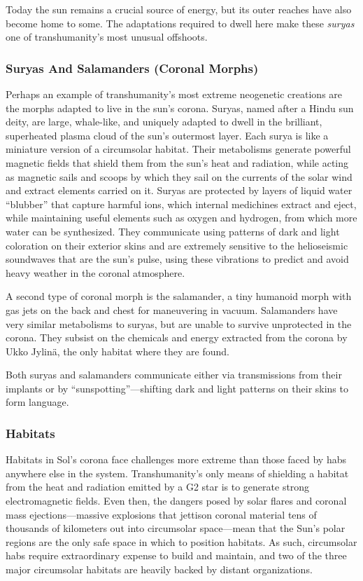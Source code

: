 Today the sun remains a crucial source of energy, 
but its outer reaches have also become home to some. 
The adaptations required to dwell here make these 
\textit{suryas} one of transhumanity's most unusual offshoots.

\subsubsection{Suryas And Salamanders (Coronal Morphs)}

Perhaps an example of transhumanity's most extreme 
neogenetic creations are the morphs adapted to live 
in the sun's corona. Suryas, named after a Hindu sun 
deity, are large, whale-like, and uniquely adapted to 
dwell in the brilliant, superheated plasma cloud of the 
sun's outermost layer. Each surya is like a miniature 
version of a circumsolar habitat. Their metabolisms 
generate powerful magnetic fields that shield them 
from the sun's heat and radiation, while acting as 
magnetic sails and scoops by which they sail on the 
currents of the solar wind and extract elements carried 
on it. Suryas are protected by layers of liquid water 
``blubber'' that capture harmful ions, which internal 
medichines extract and eject, while maintaining useful 
elements such as oxygen and hydrogen, from which 
more water can be synthesized. They communicate 
using patterns of dark and light coloration on their 
exterior skins and are extremely sensitive to the helioseismic soundwaves that are the sun's pulse, using 
these vibrations to predict and avoid heavy weather in 
the coronal atmosphere.

A second type of coronal morph is the salamander, 
a tiny humanoid morph with gas jets on the back and 
chest for maneuvering in vacuum. Salamanders have 
very similar metabolisms to suryas, but are unable to 
survive unprotected in the corona. They subsist on the 
chemicals and energy extracted from the corona by 
Ukko Jylinä, the only habitat where they are found.

Both suryas and salamanders communicate either 
via transmissions from their implants or by ``sunspotting''—shifting dark and light patterns on their skins 
to form language.

\subsubsection{Habitats}

Habitats in Sol's corona face challenges more extreme 
than those faced by habs anywhere else in the system. 
Transhumanity's only means of shielding a habitat 
from the heat and radiation emitted by a G2 star is to 
generate strong electromagnetic fields. Even then, the 
dangers posed by solar flares and coronal mass ejections—massive explosions that jettison coronal material 
tens of thousands of kilometers out into circumsolar 
space—mean that the Sun's polar regions are the only 
safe space in which to position habitats. As such, circumsolar habs require extraordinary expense to build 
and maintain, and two of the three major circumsolar 
habitats are heavily backed by distant organizations.

